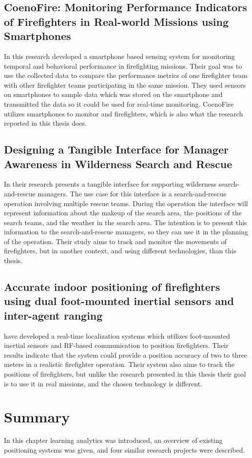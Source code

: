 \documentclass[../Main/thesis.tex]{subfiles}
\begin{document}
\subsection{CoenoFire: Monitoring Performance Indicators of Firefighters in Real-world Missions using Smartphones}
In this research \citet{Feese2013} developed a smartphone based sensing system for monitoring temporal and behavioral performance in firefighting missions.
Their goal was to use the collected data to compare the performance metrics of one firefighter team with other firefighter teams participating in the same mission.
They used sensors on smartphones to sample data which was stored on the smartphone and transmitted the data so it could be used for real-time monitoring.
CoenoFire utilizes smartphones to monitor and firefighters, which is also what the research reported in this thesis does.

\subsection{Designing a Tangible Interface for Manager Awareness in Wilderness Search and Rescue}
In their research \citet{Jones2018} presents a tangible interface for supporting wilderness search-and-rescue managers.
The use case for this interface is a search-and-rescue operation involving multiple rescue teams. 
During the operation the interface will represent information about the makeup of the search area, the positions of the search teams, and the weather in the search area.
The intention is to present this information to the search-and-rescue managers, so they can use it in the planning of the operation.
Their study aims to track and monitor the movements of firefighters, but in another context, and using different technologies, than this thesis.

\subsection{Accurate indoor positioning of firefighters using dual foot-mounted inertial sensors and inter-agent ranging}
\citet{Nilsson2014} have developed a real-time localization systems which utilizes foot-mounted inertial sensors and RF-based communication to position firefighters.
Their results indicate that the system could provide a position accuracy of two to three meters in a realistic firefighter operation.
Their system also aims to track the positions of firefighters, but unlike the research presented in this thesis their goal is to use it in real missions, and the chosen technology is different.

\section{Summary}
In this chapter learning analytics was introduced, an overview of existing positioning systems was given, and four similar research projects were described.

\blankpage
\end{document}

